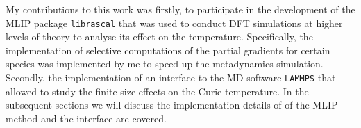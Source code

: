 My contributions to this work was firstly, to participate in the development of the MLIP package \texttt{librascal} that was used to conduct DFT simulations at higher levels-of-theory to analyse its effect on the temperature.
Specifically, the implementation of selective computations of the partial gradients for certain species was implemented by me to speed up the metadynamics simulation.
Secondly, the implementation of an interface to the MD software \texttt{LAMMPS} that allowed to study the finite size effects on the Curie temperature.
In the subsequent sections we will discuss the implementation details of of the MLIP method and the interface are covered. 


